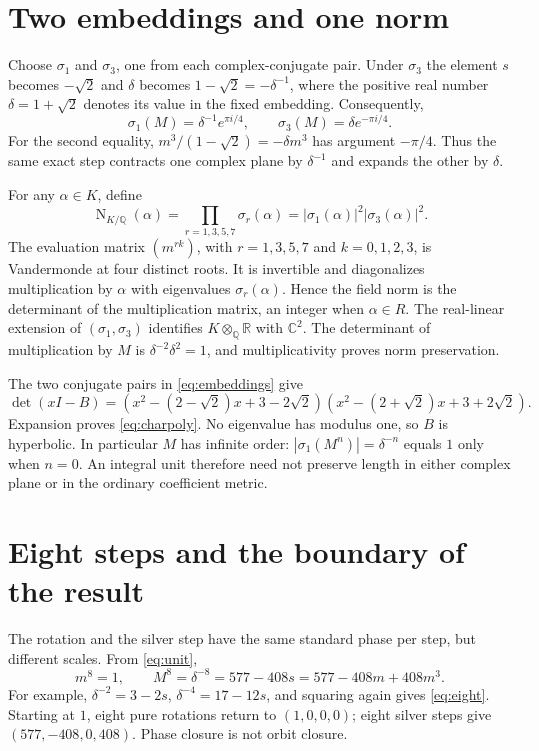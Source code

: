 \documentclass[11pt,a4paper]{article}
\newcommand{\Q}{\mathbb Q}
\newcommand{\Nm}{\operatorname{N}}
\begin{document}
\section{Two embeddings and one norm}\label{sec:embeddings}
Choose $\sigma_1$ and $\sigma_3$, one from each complex-conjugate
pair. Under $\sigma_3$ the element $s$ becomes $-\sqrt2$ and
$\delta$ becomes $1-\sqrt2=-\delta^{-1}$, where the positive real
number $\delta=1+\sqrt2$ denotes its value in the fixed embedding.
Consequently,
\begin{equation}\label{eq:embeddings}
 \sigma_1(M)=\delta^{-1}e^{\pi i/4},\qquad
 \sigma_3(M)=\delta e^{-\pi i/4}.
\end{equation}
For the second equality, $m^3/(1-\sqrt2)=-\delta m^3$
has argument $-\pi/4$. Thus the same exact step contracts one
complex plane by $\delta^{-1}$ and expands the other by $\delta$.

For any $\alpha\in K$, define
\begin{equation}\label{eq:norm}
 \Nm_{K/\Q}(\alpha)=\prod_{r=1,3,5,7}\sigma_r(\alpha)
 =|\sigma_1(\alpha)|^2|\sigma_3(\alpha)|^2.
\end{equation}
The evaluation matrix $(m^{rk})$, with $r=1,3,5,7$ and
$k=0,1,2,3$, is Vandermonde at four distinct roots. It is invertible
and diagonalizes multiplication by $\alpha$ with eigenvalues
$\sigma_r(\alpha)$. Hence the field norm is the determinant of
the multiplication matrix, an integer when $\alpha\in R$.
The real-linear extension of $(\sigma_1,\sigma_3)$ identifies
$K\otimes_{\Q}\mathbb R$ with $\mathbb C^2$.
The determinant of multiplication by $M$ is
$\delta^{-2}\delta^2=1$, and multiplicativity proves norm preservation.

The two conjugate pairs in \eqref{eq:embeddings} give
\[
 \det(xI-B)=
 (x^2-(2-\sqrt2)x+3-2\sqrt2)
 (x^2-(2+\sqrt2)x+3+2\sqrt2).
\]
Expansion proves \eqref{eq:charpoly}. No eigenvalue has modulus
one, so $B$ is hyperbolic. In particular $M$ has infinite order:
$|\sigma_1(M^n)|=\delta^{-n}$ equals $1$ only when $n=0$.
An integral unit therefore need not preserve length in either complex
plane or in the ordinary coefficient metric.

\section{Eight steps and the boundary of the result}\label{sec:scope}
The rotation and the silver step have the same standard phase per
step, but different scales. From \eqref{eq:unit},
\begin{equation}\label{eq:eight}
 m^8=1,\qquad M^8=\delta^{-8}=577-408s=577-408m+408m^3.
\end{equation}
For example, $\delta^{-2}=3-2s$, $\delta^{-4}=17-12s$, and
squaring again gives \eqref{eq:eight}. Starting at $1$, eight pure
rotations return to $(1,0,0,0)$; eight silver steps give
$(577,-408,0,408)$. Phase closure is not orbit closure.
\end{document}
